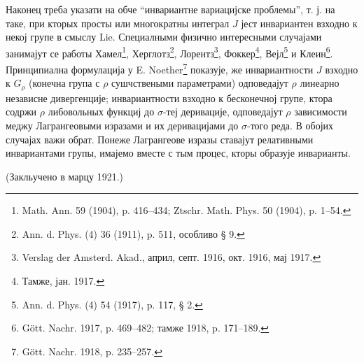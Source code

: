 ﻿\documentclass[11pt]{article}
\begin{document}
Наконец треба указати на обче ``инвариантне вариацијске проблемы'', т. ј. на таке, при кторых просты или многократны интеграл $J$ јест инвариантен взходно к некој групе в смыслу Lie. Специалными физично интересными случајами занимајут се работы Хамел\footnote{Math. Ann. 59 (1904), p. 416--434; Ztschr. Math. Phys. 50 (1904), p. 1--54.}, Херглотз\footnote{Ann. d. Phys. (4) 36 (1911), p. 511, особливо § 9.}, Лорентз\footnote{Verslag der Amsterd. Akad., април, септ. 1916, окт. 1916, мај 1917.}, Фоккер\footnote{Тамже, јан. 1917.}, Вејл\footnote{Ann. d. Phys. (4) 54 (1917), p. 117, § 2.} и Клеин\footnote{Gött. Nachr. 1917, p. 469--482; тамже 1918, p. 171--189.}. Принципиална формулација у E. Noether\footnote{Gött. Nachr. 1918, p. 235--257.} показује, же инвариантности $J$ взходно к $G_\rho$ (конечна група с $\rho$ сушчствеными параметрами) одповедајут $\rho$ линеарно независне дивергенције; инвариантности взходно к бесконечној групе, ктора содржи $\rho$ либовольных функциј до $\sigma$-теј деривације, одповедајут $\rho$ зависимости меджу Лагрангеовыми изразами и их деривацијами до $\sigma$-того реда. В обојих случајах важи обрат. Понеже Лагрангеове изразы ставајут релативными инвариантами групы, имајемо вместе с тым процес, кторы образује инварианты.

\begin{center}
(Закльучено в марцу 1921.)
\end{center}
\end{document}
